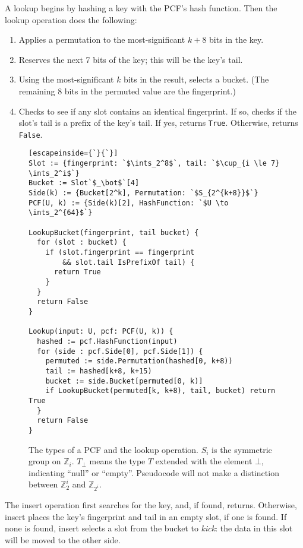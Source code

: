 \documentclass[letterpaper, 11pt]{article}
\newcommand{\ints}{\mathbb{Z}}
\begin{document}
A lookup begins by hashing a key with the PCF's hash function.
Then the lookup operation does the following:

\begin{enumerate}
\item Applies a permutation to the most-significant $k+8$ bits in the key.
\item Reserves the next 7 bits of the key; this will be the key's tail.
\item Using the most-significant $k$ bits in the result, selects a bucket.
(The remaining 8 bits in the permuted value are the fingerprint.)
\item Checks to see if any slot contains an identical fingerprint.
If so, checks if the slot's tail is a prefix of the key's tail.
If yes, returns \verb|True|.
Otherwise, returns \verb|False|.
\end{enumerate}

\begin{figure}
\begin{lstlisting}[escapeinside={`}{`}]
Slot := {fingerprint: `$\ints_2^8$`, tail: `$\cup_{i \le 7} \ints_2^i$`}
Bucket := Slot`$_\bot$`[4]
Side(k) := {Bucket[2^k], Permutation: `$S_{2^{k+8}}$`}
PCF(U, k) := {Side(k)[2], HashFunction: `$U \to \ints_2^{64}$`}

LookupBucket(fingerprint, tail bucket) {
  for (slot : bucket) {
    if (slot.fingerprint == fingerprint
        && slot.tail IsPrefixOf tail) {
      return True
    }
  }
  return False
}

Lookup(input: U, pcf: PCF(U, k)) {
  hashed := pcf.HashFunction(input)
  for (side : pcf.Side[0], pcf.Side[1]) {
    permuted := side.Permutation(hashed[0, k+8))
    tail := hashed[k+8, k+15)
    bucket := side.Bucket[permuted[0, k)]
    if LookupBucket(permuted[k, k+8), tail, bucket) return True
  }
  return False
}
\end{lstlisting}
\caption{The types of a PCF and the lookup operation.
  $S_i$ is the symmetric group on $\ints_i$.
  $T_\bot$ means the type $T$ extended with the element $\bot$, indicating ``null'' or ``empty''.
  Pseudocode will not make a distinction between $\ints_2^i$ and $\ints_{2^i}$.
}
\end{figure}

The insert operation first searches for the key, and, if found, returns.
Otherwise, insert places the key's fingerprint and tail in an empty slot, if one is found.
If none is found, insert selects a slot from the bucket to {\em kick}: the data in this slot will be moved to the other side.
\end{document}
